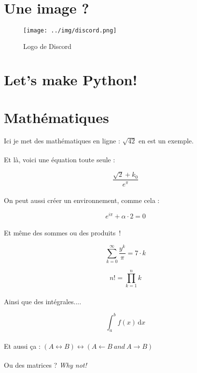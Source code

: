 \documentclass[13pt]{report}
\begin{document}
	\clearpage
	
	\section{Une image ?}

	\begin{figure}[h]
		\begin{center}
			\texttt{[image: ../img/discord.png]}
		\end{center}
		\caption{Logo de Discord}
	\end{figure}

	\clearpage
	
	\section{Let's make Python!}
	
	

	\clearpage
	
	\section{Mathématiques}
	
	Ici je met des mathématiques en ligne : \(\sqrt{42}\) en est un exemple.\\
	\\
	Et là, voici une équation toute seule : 
	
	\[
	\frac{\sqrt{2}+k_0}{e^{\pi}}
	\]
	\\
	On peut aussi créer un environnement, comme cela : 
	
	\begin{equation}
		e^{i\pi} + \alpha \cdot 2=0
	\end{equation}
	\\
	Et même des sommes ou des produits~!
	
	\begin{equation}
	\sum_{k=0}^{\infty}\frac{y^k}{\pi} = 7 \cdot k
	\end{equation}
	
	\begin{equation}
	n!=\prod_{k=1}^n k
	\end{equation}
	\\
	Ainsi que des intégrales....
	
	$$
	\int_a^b f(x) \, \mathrm{d}x
	$$
	\\
	Et aussi ça : \((A \leftrightarrow B) \leftrightarrow (A \leftarrow B ~ and ~ A \rightarrow B)\) \\
	\\
	Ou des matrices ? \emph{Why not!}
\end{document}
